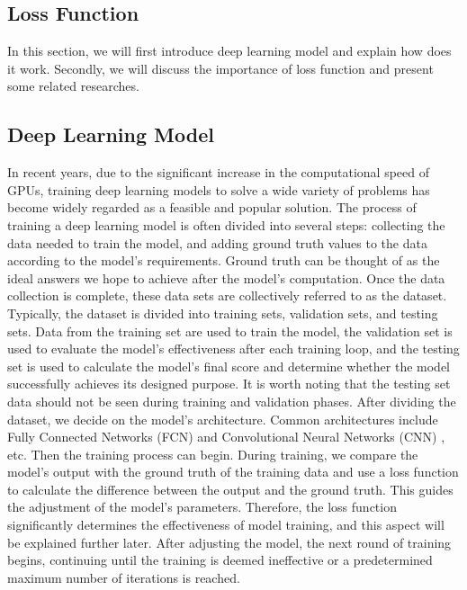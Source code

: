 \begin{ZhChapter}
    \section{Loss Function}
    In this section, we will first introduce deep learning model and explain how does it work. Secondly, we will discuss the importance of loss function and present some related researches.
    \subsection{Deep Learning Model}
    In recent years, due to the significant increase in the computational speed of GPUs, training deep learning models to solve a wide variety of problems has become widely regarded as a feasible and popular solution. The process of training a deep learning model is often divided into several steps: collecting the data needed to train the model, and adding ground truth values to the data according to the model's requirements. Ground truth can be thought of as the ideal answers we hope to achieve after the model's computation. Once the data collection is complete, these data sets are collectively referred to as the dataset. Typically, the dataset is divided into training sets, validation sets, and testing sets. Data from the training set are used to train the model, the validation set is used to evaluate the model's effectiveness after each training loop, and the testing set is used to calculate the model's final score and determine whether the model successfully achieves its designed purpose. It is worth noting that the testing set data should not be seen during training and validation phases. After dividing the dataset, we decide on the model's architecture. Common architectures include Fully Connected Networks (FCN) \cite{iliadis2018deep} and Convolutional Neural Networks (CNN) \cite{wu2017introduction}, etc. Then the training process can begin. During training, we compare the model's output with the ground truth of the training data and use a loss function to calculate the difference between the output and the ground truth. This guides the adjustment of the model's parameters. Therefore, the loss function significantly determines the effectiveness of model training, and this aspect will be explained further later. After adjusting the model, the next round of training begins, continuing until the training is deemed ineffective or a predetermined maximum number of iterations is reached.

\end{ZhChapter}
